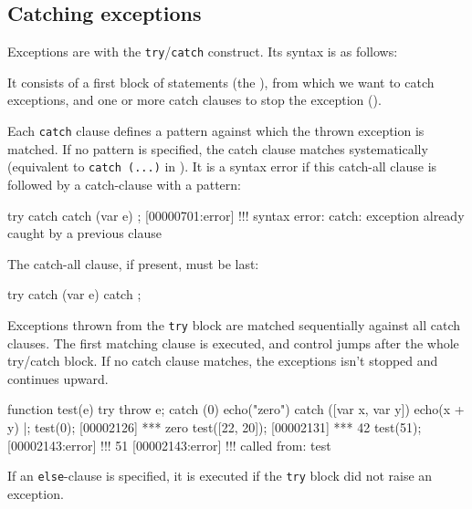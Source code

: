 \subsection{Catching exceptions}
\label{sec:lang:catch}

Exceptions are  with the
\lstinline{try}/\lstinline{catch} construct. Its syntax is as follows:


It consists of a first block of statements (the ), from which
we want to catch exceptions, and one or more catch clauses to stop the
exception ().

Each \lstinline{catch} clause defines a pattern against which the thrown
exception is matched. If no pattern is specified, the catch clause matches
systematically (equivalent to \lstinline|catch (...)| in \Cxx).  It is a
syntax error if this catch-all clause is followed by a catch-clause with a
pattern:

\begin{urbiscript}
try {} catch {} catch (var e) {};
[00000701:error] !!! syntax error: catch: exception already caught by a previous clause
\end{urbiscript}

\noindent
The catch-all clause, if present, must be last:

\begin{urbiscript}
try {} catch (var e) {} catch {};
\end{urbiscript}

Exceptions thrown from the \lstinline{try} block are matched sequentially
against all catch clauses. The first matching clause is executed, and
control jumps after the whole try/catch block. If no catch clause matches,
the exceptions isn't stopped and continues upward.

\begin{urbiscript}
function test(e)
{
  try
  { throw e;  }
  catch (0)
  { echo("zero") }
  catch ([var x, var y])
  { echo(x + y) }
}|;
test(0);
[00002126] *** zero
test([22, 20]);
[00002131] *** 42
test(51);
[00002143:error] !!! 51
[00002143:error] !!!    called from: test
\end{urbiscript}

%
If an \lstinline{else}-clause is specified, it is executed if the
\lstinline{try} block did not raise an exception.


